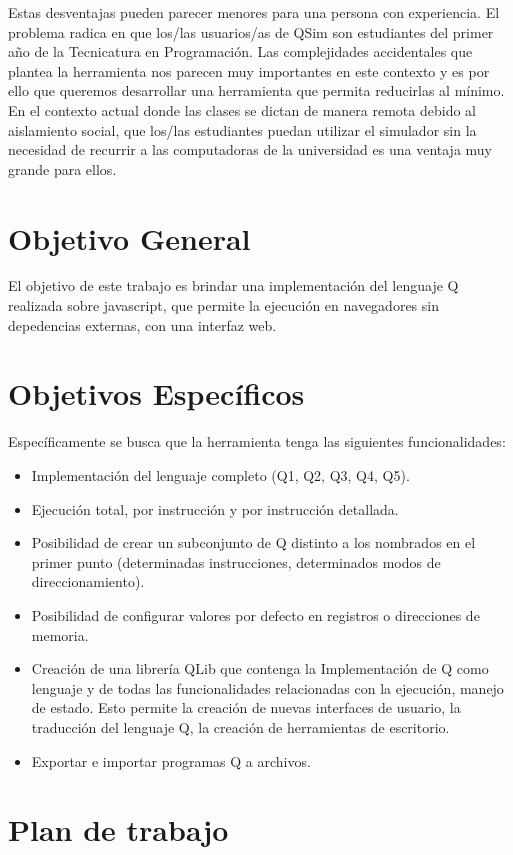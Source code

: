 \documentclass[a4paper,10pt]{article}
\begin{document}
Estas desventajas pueden parecer menores para una persona con experiencia. El problema radica en que los/las usuarios/as de QSim son estudiantes del primer año de la Tecnicatura en Programación. Las complejidades accidentales que plantea la herramienta nos parecen muy importantes en este contexto y es por ello que queremos desarrollar una herramienta que permita reducirlas al mínimo. En el contexto actual donde las clases se dictan de manera remota debido al aislamiento social, que los/las estudiantes puedan utilizar el simulador sin la necesidad de recurrir a las computadoras de la universidad es una ventaja muy grande para ellos.

\section*{Objetivo General}
El objetivo de este trabajo es brindar una implementación del lenguaje Q realizada sobre javascript, que permite la ejecución en navegadores sin depedencias externas, con una interfaz web.

\section*{Objetivos Específicos}
Específicamente se busca que la herramienta tenga las siguientes funcionalidades: 

\begin{itemize}
\item Implementación del lenguaje completo (Q1, Q2, Q3, Q4, Q5). 
\item Ejecución total, por instrucción y por instrucción detallada. 
\item Posibilidad de crear un subconjunto de Q distinto a los nombrados en el primer punto (determinadas instrucciones, determinados modos de direccionamiento). 
\item Posibilidad de configurar valores por defecto en registros o direcciones de memoria. 
\item Creación de una librería QLib que contenga la Implementación de Q como lenguaje y de todas las funcionalidades relacionadas con la ejecución, manejo de estado. Esto permite la creación de nuevas interfaces de usuario, la traducción del lenguaje Q, la creación de herramientas de escritorio.
\item Exportar e importar programas Q a archivos.

\end{itemize}

\section*{Plan de trabajo}
\end{document}

